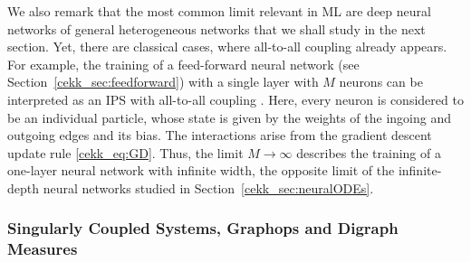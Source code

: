 \documentclass[10pt]{article}
\begin{document}
We also remark that the most common limit relevant in ML are deep neural networks of general heterogeneous networks that we shall study in the next section. Yet, there are classical cases, where all-to-all coupling already appears. For example, the training of a feed-forward neural network (see Section~\ref{cekk_sec:feedforward}) with a single layer with $M$ neurons can be interpreted as an IPS with all-to-all coupling \cite{Chizat18, Sirignano20, Gess25}. Here, every neuron is considered to be an individual particle, whose state is given by the weights of the ingoing and outgoing edges and its bias. The interactions arise from the gradient descent update rule \eqref{cekk_eq:GD}. Thus, the limit $M\to \infty$ describes the training of a one-layer neural network with infinite width, the opposite limit of the infinite-depth neural networks studied in Section~\ref{cekk_sec:neuralODEs}.

\subsubsection*{Singularly Coupled Systems, Graphops and Digraph Measures}
\end{document}

